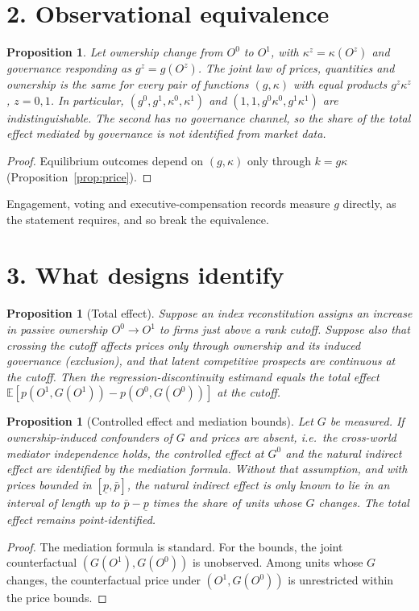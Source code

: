 \documentclass[11pt]{article}
\newtheorem{proposition}[theorem]{Proposition}
\theoremstyle{definition}
\begin{document}
\section*{2. Observational equivalence}
\begin{proposition}\label{prop:oe}
Let ownership change from $O^0$ to $O^1$, with $\kappa^z=\kappa(O^z)$ and governance responding as $g^z=g(O^z)$. The joint law of
prices, quantities and ownership is the same for every pair of functions $(g,\kappa)$ with equal products
$g^z\kappa^z$, $z=0,1$. In particular, $(g^0,g^1,\kappa^0,\kappa^1)$ and
$(1,1,g^0\kappa^0,g^1\kappa^1)$ are indistinguishable. The second has no governance channel, so the share of the total effect
mediated by governance is not identified from market data.
\end{proposition}
\begin{proof}
Equilibrium outcomes depend on $(g,\kappa)$ only through $k=g\kappa$ (Proposition~\ref{prop:price}).
\end{proof}
Engagement, voting and executive-compensation records measure $g$ directly, as the statement requires, and so break the
equivalence.

\section*{3. What designs identify}
\begin{proposition}[Total effect]\label{prop:total}
Suppose an index reconstitution assigns an increase in passive ownership $O^0\to O^1$ to firms just above a rank cutoff.
Suppose also that crossing the cutoff affects prices only through ownership and its induced governance (exclusion), and that
latent competitive prospects are continuous at the cutoff. Then the regression-discontinuity estimand equals the total effect
$\mathbb E[p(O^1,G(O^1))-p(O^0,G(O^0))]$ at the cutoff.
\end{proposition}
\begin{proposition}[Controlled effect and mediation bounds]\label{prop:med}
Let $G$ be measured. If ownership-induced confounders of $G$ and prices are absent, i.e.\ the cross-world mediator
independence holds, the controlled effect at $G^0$ and the natural indirect effect are identified by the mediation formula.
Without that assumption, and with prices bounded in $[\underline p,\bar p]$, the natural indirect effect is only known to lie
in an interval of length up to $\bar p-\underline p$ times the share of units whose $G$ changes. The total effect remains
point-identified.
\end{proposition}
\begin{proof}
The mediation formula is standard. For the bounds, the joint counterfactual $(G(O^1),G(O^0))$ is unobserved. Among
units whose $G$ changes, the counterfactual price under $(O^1,G(O^0))$ is unrestricted within the price bounds.
\end{proof}
\end{document}
